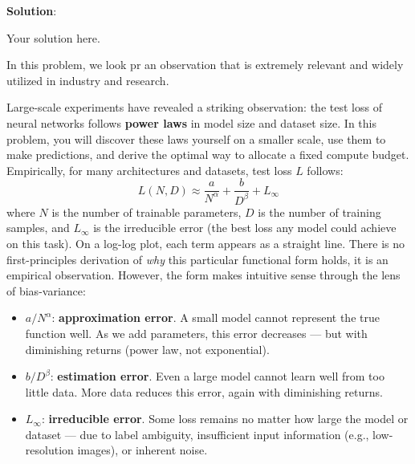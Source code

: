 \documentclass[submit]{../harvardml}
\newenvironment{solution}{
    \vspace{2mm}
    \color{blue}\noindent\textbf{Solution}:
}{}
\begin{document}
\begin{solution}
	Your solution here.
\end{solution}


\newpage


\begin{problem}
In this problem, we look pr an observation that is extremely relevant and widely utilized in industry and research.

Large-scale experiments have revealed a striking observation: the test loss of neural networks follows \textbf{power laws} in model size and dataset size. In this problem, you will discover these laws yourself on a smaller scale, use them to make predictions, and derive the optimal way to allocate a fixed compute budget.
Empirically, for many architectures and datasets, test loss $L$ follows:
\begin{equation}\label{eq:scaling}
    L(N, D) \approx \frac{a}{N^{\alpha}} + \frac{b}{D^{\beta}} + L_{\infty}
\end{equation}
where $N$ is the number of trainable parameters, $D$ is the number of training samples, and $L_\infty$ is the irreducible error (the best loss any model could achieve on this task). On a log-log plot, each term appears as a straight line.
There is no first-principles derivation of \emph{why} this particular functional form holds, it is an empirical observation. However, the form makes intuitive sense through the lens of bias-variance:
\begin{itemize}
    \item $a / N^\alpha$: \textbf{approximation error}. A small model cannot represent the true function well. As we add parameters, this error decreases --- but with diminishing returns (power law, not exponential).
    \item $b / D^\beta$: \textbf{estimation error}. Even a large model cannot learn well from too little data. More data reduces this error, again with diminishing returns.
    \item $L_\infty$: \textbf{irreducible error}. Some loss remains no matter how large the model or dataset --- due to label ambiguity, insufficient input information (e.g., low-resolution images), or inherent noise.
\end{itemize}

\end{problem}
\end{document}
